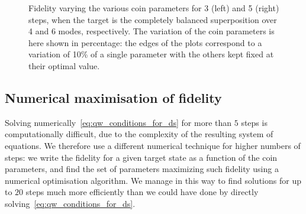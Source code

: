 \begin{figure}[]
    \centering
    \begin{minipage}[b]{0.5\textwidth}
    \end{minipage}%
    \begin{minipage}[b]{0.5\textwidth}
    \end{minipage}
    \caption{
        Fidelity varying the various coin parameters for 3 (left) and 5 (right) steps, when the target is the completely balanced superposition over 4 and 6 modes, respectively.
        The variation of the coin parameters is here shown in percentage: the edges of the plots correspond to a variation of 10\% of a single parameter with the others kept fixed at their optimal value.
    }
    \label{fig:stabilities_3and5steps_balanced_target}
\end{figure}

\FloatBarrier
\subsection{Numerical maximisation of fidelity}
\label{sec:qw_numerical_fid_max}

Solving numerically~\cref{eq:qw_conditions_for_ds} for more than $5$ steps is computationally difficult, due to the complexity of the resulting system of equations.
We therefore use a different numerical technique for higher numbers of steps:
we write the fidelity for a given target state as a function of the coin parameters, and find the set of parameters maximizing such fidelity using a numerical optimisation algorithm.
We manage in this way to find solutions for up to $20$ steps much more efficiently than we could have done by directly solving~\cref{eq:qw_conditions_for_ds}.

